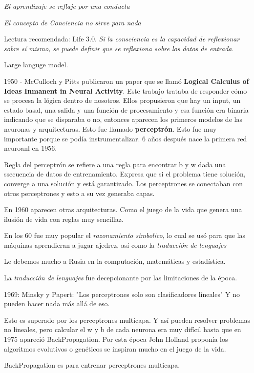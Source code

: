 \documentclass{article}
\theoremstyle{definition}
\begin{document}
\textit{El aprendizaje se reflaje por una conducta}

\textit{El concepto de Conciencia no sirve para nada}

Lectura recomendada: Life 3.0.
\textit{Si la consciencia es la capacidad de reflexionar sobre sí mismo, se 
puede definir que se reflexiona sobre los datos de entrada}.

Large languge model.

1950 - McCulloch y Pitts publicaron un paper que se llamó \textbf{Logical 
Calculus of Ideas Inmanent in Neural Activity}. Este trabajo trataba de 
responder cómo se procesa la lógica dentro de nosotros. Ellos propusieron 
que hay un input, un estado basal, una salida y una función de procesamiento 
y esa función era binaria indicando que se disparaba o no, entonces aparecen 
los primeros modelos de las neuronas y arquitecturas. Esto fue llamado 
\textbf{perceptrón}. Esto fue muy importante porque se podía 
instrumentalizar. 6 años después nace la primera red neuroanl en 1956.

Regla del perceptrón se refiere a una regla para encontrar b y w dada una 
ssecuencia de datos de entrenamiento. Expresa que si el problema tiene 
solución, converge a una solución y está garantizado. Los perceptrones 
se conectaban con otros perceptrones y esto a su vez generaba capas.

En 1960 aparecen otras arquitecturas. Como el juego de la vida que genera 
una ilusión de vida con reglas muy sencillaz.

En los 60 fue muy popular el \textit{razonamiento simbolico}, lo cual se 
usó para que las máquinas aprendieran a jugar ajedrez, así como la 
\textit{traducción de lenguajes}

Le debemos mucho a Rusia en la computación, matemáticas y estadística.

La \textit{traducción de lenguajes} fue decepcionante por las limitaciones 
de la época.

1969:  Minsky y Papert: "Los perceptrones solo son clasificadores lineales"
Y no pueden hacer nada más allá de eso.

Esto es superado por los perceptrones multicapa. Y así pueden resolver 
problemas no lineales, pero calcular el w y b de cada neurona era muy 
difícil hasta que en 1975 apareció BackPropagation. Por esta época 
John Holland proponía los algoritmos evolutivos o genéticos se inspiran
mucho en el juego de la vida.

BackPropagation es para entrenar perceptrones multicapa.
\end{document}
